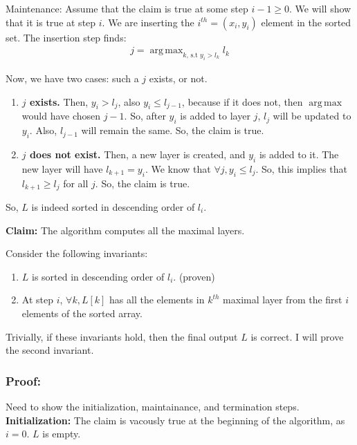 \documentclass[a4paper]{article}
\DeclareMathOperator*{\argmax}{arg\,max}
\begin{document}
Maintenance: Assume that the claim is true at some step $i-1 \geq 0$. We will show that it is true at step $i$. We are inserting the $i^{th} = (x_i, y_i)$ element in the sorted set. The insertion step finds:
\begin{align*}
    j = \argmax_{k \text{, s.t $y_i > l_k$}} l_k
\end{align*}

Now, we have two cases: such a $j$ exists, or not.
\begin{enumerate}
    \item \textbf{$j$ exists.} Then, $y_i > l_j$, also $y_i \leq l_{j-1}$, because if it does not, then $\argmax$ would have chosen $j-1$. So, after $y_i$ is added to layer $j$, $l_j$ will be updated to $y_i$. Also, $l_{j-1}$ will remain the same. So, the claim is true.
    \item \textbf{$j$ does not exist.} Then, a new layer is created, and $y_i$ is added to it. The new layer will have $l_{k+1} = y_i$. We know that $\forall j, y_i \leq l_j$. So, this implies that $l_{k+1} \geq l_j$ for all $j$. So, the claim is true.
\end{enumerate}

So, $L$ is indeed sorted in descending order of $l_i$.\\

\newpage

\textbf{Claim:} The algorithm computes all the maximal layers.

Consider the following invariants:

\begin{enumerate}
    \item $L$ is sorted in descending order of $l_i$. (proven)
    \item At step $i$, $\forall k, L[k]$ has all the elements in $k^{th}$ maximal layer from the first $i$ elements of the sorted array.
\end{enumerate}

Trivially, if these invariants hold, then the final output $L$ is correct. I will prove the second invariant.
\subsubsection*{Proof:}

Need to show the initialization, maintainance, and termination steps.\\

\textbf{Initialization:} The claim is vacously true at the beginning of the algorithm, as $i=0$. $L$ is empty.\\
\end{document}
